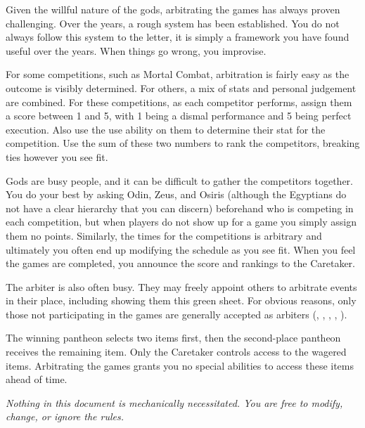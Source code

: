 \documentclass[green]{guardians}
\begin{document}
\name{\gArbiter{}}

Given the willful nature of the gods, arbitrating the games has always proven challenging. Over the years, a rough system has been established. You do not always follow this system to the letter, it is simply a framework you have found useful over the years. When things go wrong, you improvise.

For some competitions, such as Mortal Combat, arbitration is fairly easy as the outcome is visibly determined. For others, a mix of stats and personal judgement are combined. For these competitions, as each competitor performs, assign them a score between 1 and 5, with 1 being a dismal performance and 5 being perfect execution. Also use the use \aExamine{} ability on them to determine their stat for the competition. Use the sum of these two numbers to rank the competitors, breaking ties however you see fit.

Gods are busy people, and it can be difficult to gather the competitors together. You do your best by asking Odin, Zeus, and Osiris (although the Egyptians do not have a clear hierarchy that you can discern) beforehand who is competing in each competition, but when players do not show up for a game you simply assign them no points. Similarly, the times for the competitions is arbitrary and ultimately you often end up modifying the schedule as you see fit. When you feel the games are completed, you announce the score and rankings to the Caretaker.

The arbiter is also often busy. They may freely appoint others to arbitrate events in their place, including showing them this green sheet. For obvious reasons, only those not participating in the games are generally accepted as arbiters (\cAmaterasu{}, \cKachiko{}, \cJascha{}, \cCaretaker{}, \cWarden{}).

The winning pantheon selects two items first, then the second-place pantheon receives the remaining item. Only the Caretaker controls access to the wagered items. Arbitrating the games grants you no special abilities to access these items ahead of time.

\emph{Nothing in this document is mechanically necessitated. You are free to modify, change, or ignore the rules.}
\end{document}
